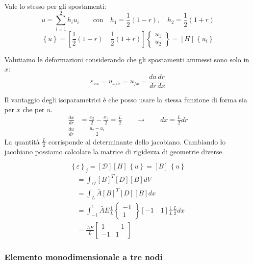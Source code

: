 Vale lo stesso per gli spostamenti:
\begin{equation*}
    u=\sum^2_{i=1} h_iu_i \qquad \text{con} \quad h_1=\frac{1}{2}(1-r), \quad  h_2=\frac{1}{2}(1+r)
\end{equation*}
\begin{equation*}
    \left\{u \right\} = \left[\frac{1}{2}(1-r) \quad  \frac{1}{2}(1+r)\right]\begin{Bmatrix}
        u_1\\u_2
    \end{Bmatrix}= [H] \,\left\{u_i \right\}
\end{equation*}

Valutiamo le deformazioni considerando che gli spostamenti ammessi sono solo in $x$:
\begin{equation*}
    \varepsilon_{xx}=u_{x/x}=u_{/x}=\frac{du}{dr}\frac{dr}{dx}
\end{equation*}

Il vantaggio degli isoparametrici è che posso usare la stessa funzione di forma sia per $x$ che per $u$.
\begin{align*}
    \frac{dx}{dr}&=\frac{x_2}{2}-\frac{x_1}{2}=\frac{L}{2}  \qquad\rightarrow\qquad dx=\frac{L}{2}dr\\
      \frac{du}{dr}&=\frac{u_2-u_1}{2}
\end{align*}
La quantità $\frac{L}{2}$ corrisponde al determinante dello jacobiano. Cambiando lo jacobiano possiamo calcolare la matrice di rigidezza di geometrie diverse.

\begin{equation*}
    \left\{\varepsilon \right\}_j = [\mathcal{D}][H] \,\left\{u \right\}= [B] \,\left\{u \right\}
\end{equation*}
\begin{align*}
  [K]  &=  \int_\Omega [B]^T[D][B]dV\\
   &=  \int_L \bar{A}[B]^T[D][B]dx\\
    &=  \int_{-1}^1\bar{A}E\frac{1}{L}   \begin{Bmatrix}
        -1\\1\end{Bmatrix} [-1\quad 1] \frac{1}{L}\frac{L}{2}
    dx\\
    &= \frac{ \bar{A}E }{L} \begin{bmatrix}
        1&-1\\-1&1
    \end{bmatrix}
\end{align*}


\subsubsection*{Elemento monodimensionale a tre nodi}

